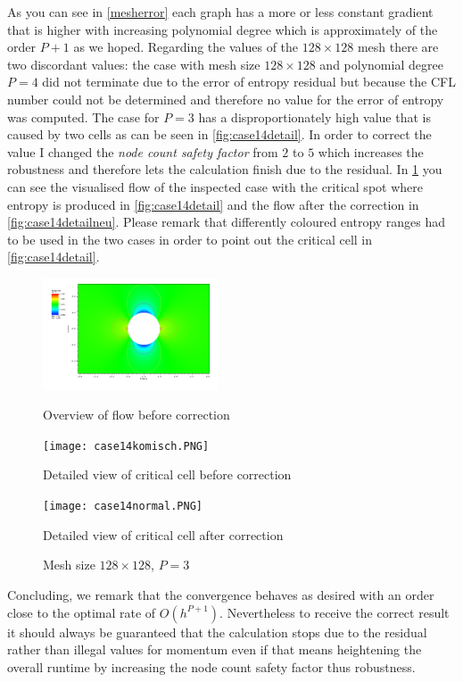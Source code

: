 	As you can see in \ref{mesherror} each graph has a more or less constant gradient that is higher with increasing polynomial degree which is approximately of the order $P+1$ as we hoped. Regarding the values of the $128 \times 128$ mesh there are two discordant values: the case with mesh size $128 \times 128$ and polynomial degree $P = 4$ did not terminate due to the error of entropy residual but because the CFL number could not be determined and therefore no value for the error of entropy was computed. The case for $P = 3$ has a disproportionately high value that is caused by two cells as can be seen in \ref{fig:case14detail}. In order to correct the value I changed the \textit{node count safety factor} from $2$ to $5$ which increases the robustness and therefore lets the calculation finish due to the residual. In \ref{fig:case14} you can see the visualised flow of the inspected case with the critical spot where entropy is produced in \ref{fig:case14detail} and the flow after the correction in \ref{fig:case14detailneu}. Please remark that differently coloured entropy ranges had to be used in the two cases in order to point out the critical cell in \ref{fig:case14detail}.
	
	\begin{figure}[htp]
		\centering
		\begin{minipage}[b]{0.3\textwidth}
			\centering
			\includegraphics[height=3.3cm]{img/case14.PNG}
			\caption{Overview of flow before correction}
		\end{minipage}
		\begin{minipage}[b]{0.3\textwidth}
			\centering
			\texttt{[image: case14komisch.PNG]}
			\caption{Detailed view of critical cell before correction}
			\label{fig:case14detail}
		\end{minipage}
		\begin{minipage}[b]{0.3\textwidth}
			\centering
			\texttt{[image: case14normal.PNG]}
			\caption{Detailed view of critical cell after correction}
			\label{fig:case14detailneu}
		\end{minipage}
		\caption{Mesh size $128 \times 128$, $P = 3$}
		\label{fig:case14}
	\end{figure}
	
	Concluding, we remark that the convergence behaves as desired with an order close to the optimal rate of $O(h^{P+1})$. Nevertheless to receive the correct result it should always be guaranteed that the calculation stops due to the residual rather than illegal values for momentum even if that means heightening the overall runtime by increasing the node count safety factor thus robustness.
	
